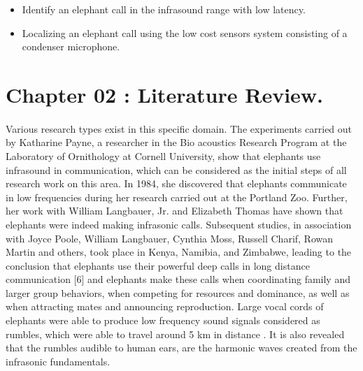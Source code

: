 \documentclass[11pt]{article}
\numberwithin{figure}{section}
\numberwithin{table}{section}
\begin{document}
\begin{flushleft}
\end{flushleft}

\begin{itemize}

\item 	Identify an elephant call in the infrasound range with low latency.
\item 	Localizing an elephant call using the low cost sensors system consisting of a condenser microphone.
\end{itemize}

\newpage
\section*{Chapter 02 : Literature Review.}
\paragraph{}
Various research types exist in this specific domain. The experiments carried out by Katharine Payne, a researcher in the Bio acoustics Research Program at the Laboratory of Ornithology at Cornell University, show that elephants use infrasound in communication, which can be considered as the initial steps of all research work on this area. In 1984, she discovered that elephants communicate in low frequencies during her research carried out at the Portland Zoo. Further, her work with William Langbauer, Jr. and Elizabeth Thomas have shown that elephants were indeed making infrasonic calls. Subsequent studies, in association with Joyce Poole, William Langbauer, Cynthia Moss, Russell Charif, Rowan Martin and others, took place in Kenya, Namibia, and Zimbabwe, leading to the conclusion that elephants use their powerful deep calls in long distance communication [6] and elephants make these calls when coordinating family and larger group behaviors, when competing for resources and dominance, as well as when attracting mates and announcing reproduction. Large vocal cords of elephants were able to produce low frequency sound signals considered as rumbles, which were able to travel around 5 km in distance \cite {6}. It is also revealed that the rumbles audible to human ears, are the harmonic waves created from the infrasonic fundamentals.
\end{document}
